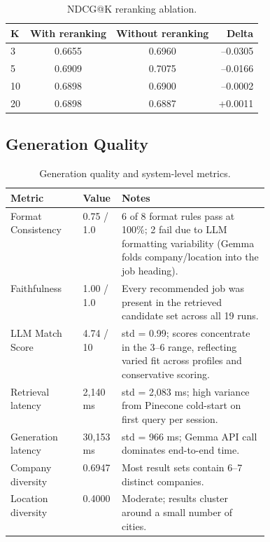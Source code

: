 \documentclass[11pt]{article}
\begin{document}
\begin{table}[H]
\centering\small
\begin{tabular}{lccr}
\toprule
\textbf{K} & \textbf{With reranking} & \textbf{Without reranking} & \textbf{Delta} \\
\midrule
3  & 0.6655 & 0.6960 & --0.0305 \\
5  & 0.6909 & 0.7075 & --0.0166 \\
10 & 0.6898 & 0.6900 & --0.0002 \\
20 & 0.6898 & 0.6887 & +0.0011  \\
\bottomrule
\end{tabular}
\caption{NDCG@K reranking ablation.}
\end{table}

\subsection{Generation Quality}

\begin{table}[H]
\centering\small
\begin{tabularx}{\linewidth}{p{0.28\linewidth}p{0.15\linewidth}X}
\toprule
\textbf{Metric} & \textbf{Value} & \textbf{Notes} \\
\midrule
Format Consistency  & 0.75 / 1.0  & 6 of 8 format rules pass at 100\%; 2 fail due to LLM formatting variability (Gemma folds company/location into the job heading). \\
Faithfulness        & 1.00 / 1.0  & Every recommended job was present in the retrieved candidate set across all 19 runs. \\
LLM Match Score     & 4.74 / 10   & std = 0.99; scores concentrate in the 3--6 range, reflecting varied fit across profiles and conservative scoring. \\
\midrule
Retrieval latency   & 2,140 ms    & std = 2,083 ms; high variance from Pinecone cold-start on first query per session. \\
Generation latency  & 30,153 ms   & std = 966 ms; Gemma API call dominates end-to-end time. \\
Company diversity   & 0.6947      & Most result sets contain 6--7 distinct companies. \\
Location diversity  & 0.4000      & Moderate; results cluster around a small number of cities. \\
\bottomrule
\end{tabularx}
\caption{Generation quality and system-level metrics.}
\end{table}
\end{document}
